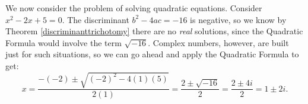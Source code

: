 

\medskip

We now consider the problem of solving quadratic equations. Consider  $x^2-2x+5 = 0$. The discriminant $b^2 - 4ac = -16$ is negative, so we know by Theorem \ref{discriminanttrichotomy} there are no \textit{real} solutions, since the Quadratic Formula would involve the term $\sqrt{-16}$.  Complex numbers, however, are built just for such situations, so we can go ahead and apply the Quadratic Formula to get: \[ x = \dfrac{-(-2) \pm \sqrt{(-2)^2-4(1)(5)}}{2(1)} = \dfrac{2 \pm \sqrt{-16}}{2} = \dfrac{2 \pm 4i}{2} = 1 \pm 2i.\]  

\medskip

